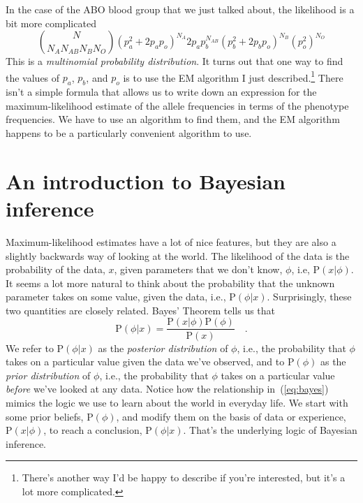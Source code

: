 In the case of the ABO blood group that we just talked about, the
likelihood is a bit more complicated
\begin{equation}
{N \choose N_A N_{AB} N_B N_O}
\left(p_a^2 + 2p_ap_o\right)^{N_A}
2p_ap_b^{N_{AB}}
\left(p_b^2 + 2p_bp_o\right)^{N_B}
\left(p_o^2\right)^{N_O}
\end{equation}
This is a {\it multinomial probability distribution}. It turns out
that one way to find the values of $p_a$, $p_b$, and $p_o$ is to use
the EM algorithm I just described.\footnote{There's another way I'd be
  happy to describe if you're interested, but it's a lot more
  complicated.} There isn't a simple formula that allows us to write
down an expression for the maximum-likelihood estimate of the allele
frequencies in terms of the phenotype frequencies. We have to use an
algorithm to find them, and the EM algorithm happens to be a
particularly convenient algorithm to use. 

\section*{An introduction to Bayesian inference}

Maximum-likelihood estimates have a lot of nice features, but they are
also a slightly backwards way of looking at the world. The likelihood
of the data is the probability of the data, $x$, given parameters that
we don't know, $\phi$, i.e, $\mbox{P}(x|\phi)$. It seems a lot more
natural to think about the probability that the unknown parameter
takes on some value, given the data, i.e.,
$\mbox{P}(\phi|x)$. Surprisingly, these two quantities are closely
related. Bayes' Theorem tells us that
\begin{equation}
\mbox{P}(\phi|x) = \frac{\mbox{P}(x|\phi)\mbox{P}(\phi)}{\mbox{P}(x)} \quad .
\label{eq:bayes}
\end{equation}
We refer to $\mbox{P}(\phi|x)$ as the {\it posterior distribution} of
$\phi$, i.e., the probability that $\phi$ takes on a particular value
given the data we've observed, and to $\mbox{P}(\phi)$ as the {\it
  prior distribution} of $\phi$, i.e., the probability that $\phi$
takes on a particular value {\it before\/} we've looked at any
data. Notice how the relationship in~(\ref{eq:bayes}) mimics the logic
we use to learn about the world in everyday life. We start with some
prior beliefs, $\mbox{P}(\phi)$, and modify them on the basis of data
or experience, $\mbox{P}(x|\phi)$, to reach a conclusion,
$\mbox{P}(\phi|x)$. That's the underlying logic of Bayesian
inference.

